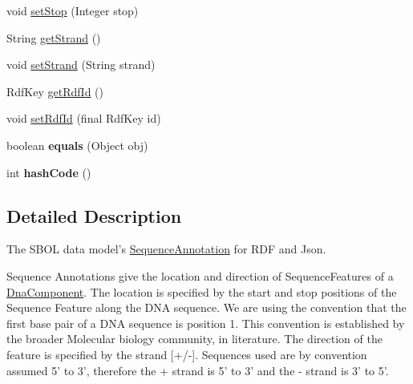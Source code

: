 \begin{DoxyCompactItemize}
\item 
void \hyperlink{classorg_1_1sbolstandard_1_1lib_s_b_o_lj_1_1_sequence_annotation_ab7a4aa665660144ec8b2cb0db4eede90}{setStop} (Integer stop)
\item 
String \hyperlink{classorg_1_1sbolstandard_1_1lib_s_b_o_lj_1_1_sequence_annotation_af6151fa72051de5503b6aa42ed3736f3}{getStrand} ()
\item 
void \hyperlink{classorg_1_1sbolstandard_1_1lib_s_b_o_lj_1_1_sequence_annotation_a2cbe0151ae2b5e55ce84f743d69fbb04}{setStrand} (String strand)
\item 
RdfKey \hyperlink{classorg_1_1sbolstandard_1_1lib_s_b_o_lj_1_1_sequence_annotation_a1f19b514d0479cc3a72c28ee30fa039d}{getRdfId} ()
\item 
void \hyperlink{classorg_1_1sbolstandard_1_1lib_s_b_o_lj_1_1_sequence_annotation_a2d6d50edfb41d4f6f5553437681b755a}{setRdfId} (final RdfKey id)
\item 
\hypertarget{classorg_1_1sbolstandard_1_1lib_s_b_o_lj_1_1_sequence_annotation_a957f1186f47b0929d759900e6edfbc1c}{
boolean {\bfseries equals} (Object obj)}
\label{classorg_1_1sbolstandard_1_1lib_s_b_o_lj_1_1_sequence_annotation_a957f1186f47b0929d759900e6edfbc1c}

\item 
\hypertarget{classorg_1_1sbolstandard_1_1lib_s_b_o_lj_1_1_sequence_annotation_afd50d2e97e53ba975a7a1637aeab66d2}{
int {\bfseries hashCode} ()}
\label{classorg_1_1sbolstandard_1_1lib_s_b_o_lj_1_1_sequence_annotation_afd50d2e97e53ba975a7a1637aeab66d2}

\end{DoxyCompactItemize}


\subsection{Detailed Description}
The SBOL data model's \hyperlink{classorg_1_1sbolstandard_1_1lib_s_b_o_lj_1_1_sequence_annotation}{SequenceAnnotation} for RDF and Json.

Sequence Annotations give the location and direction of SequenceFeatures of a \hyperlink{classorg_1_1sbolstandard_1_1lib_s_b_o_lj_1_1_dna_component}{DnaComponent}. The location is specified by the start and stop positions of the Sequence Feature along the DNA sequence. We are using the convention that the first base pair of a DNA sequence is position 1. This convention is established by the broader Molecular biology community, in literature. The direction of the feature is specified by the strand \mbox{[}+/-\/\mbox{]}. Sequences used are by convention assumed 5' to 3', therefore the {\ttfamily +} strand is 5' to 3' and the {\ttfamily -\/} strand is 3' to 5'.

